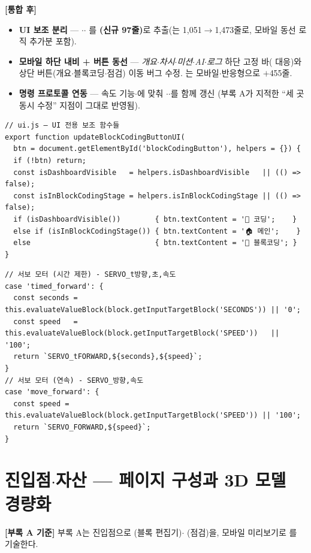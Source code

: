 \smallskip
\noindent\textbf{[통합 후]}
\begin{itemize}
  \item \textbf{UI 보조 분리} --- $\cdot$$\cdot$%
  를 \textbf{(신규 97줄)}로 추출(는
  1,051$\to$1,473줄로, 모바일 동선 로직 추가분 포함).
  \item \textbf{모바일 하단 내비 + 버튼 동선} --- \emph{개요$\cdot$차시$\cdot$미션$\cdot$AI$\cdot$로그}
  하단 고정 바( 대응)와 상단 버튼(개요$\cdot$블록코딩$\cdot$점검) 이동
  버그 수정. 는 모바일$\cdot$반응형으로 $+$455줄.
  \item \textbf{명령 프로토콜 연동} --- 속도 기능$\cdot$에 맞춰
  $\cdot$$\cdot$를 함께 갱신
  (부록 A가 지적한 ``세 곳 동시 수정'' 지점이 그대로 반영됨).
\end{itemize}

\begin{verbatim}
// ui.js — UI 전용 보조 함수들
export function updateBlockCodingButtonUI(
  btn = document.getElementById('blockCodingButton'), helpers = {}) {
  if (!btn) return;
  const isDashboardVisible   = helpers.isDashboardVisible   || (() => false);
  const isInBlockCodingStage = helpers.isInBlockCodingStage || (() => false);
  if (isDashboardVisible())        { btn.textContent = '🧩 코딩';    }
  else if (isInBlockCodingStage()) { btn.textContent = '🏠 메인';    }
  else                             { btn.textContent = '🧩 블록코딩'; }
}
\end{verbatim}

\begin{verbatim}
// 서보 모터 (시간 제한) - SERVO_t방향,초,속도
case 'timed_forward': {
  const seconds = this.evaluateValueBlock(block.getInputTargetBlock('SECONDS')) || '0';
  const speed   = this.evaluateValueBlock(block.getInputTargetBlock('SPEED'))   || '100';
  return `SERVO_tFORWARD,${seconds},${speed}`;
}
// 서보 모터 (연속) - SERVO_방향,속도
case 'move_forward': {
  const speed = this.evaluateValueBlock(block.getInputTargetBlock('SPEED')) || '100';
  return `SERVO_FORWARD,${speed}`;
}
\end{verbatim}

\section{진입점$\cdot$자산 --- 페이지 구성과 3D 모델 경량화}
\textbf{[부록 A 기준]} 부록 A는 진입점으로 (블록 편집기)$\cdot$%
(점검)을, 모바일 미리보기로 를 기술한다.

